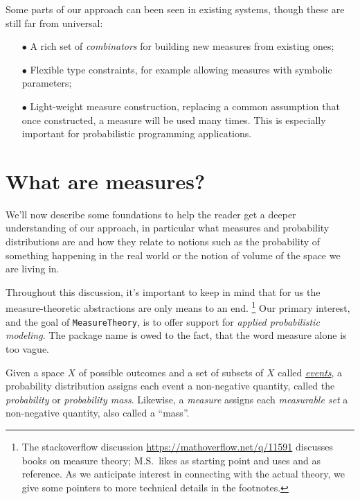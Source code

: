 \documentclass{juliacon}
\begin{document}
Some parts of our approach can been seen in existing systems, though these are still far from universal:
\begin{itemize}
    \item[$\bullet\!$] A rich set of \emph{combinators} for building new measures from existing ones;
    \item[$\bullet\!$] Flexible type constraints, for example allowing measures with symbolic parameters;
    \item[$\bullet\!$] Light-weight measure construction, replacing a common assumption that once constructed, a measure will be used many times. This is especially important for probabilistic programming applications.
\end{itemize}

\section{What are measures?}

We'll now describe some foundations to help the reader get a deeper understanding of our approach, in particular what measures and probability distributions are and how they relate to notions such as the probability of something happening in the real world or the notion of volume of the space we are living in. 

Throughout this discussion, it's important to keep in mind that for us the measure-theoretic abstractions are only means to an end.%
\footnote{The stackoverflow discussion \url{https://mathoverflow.net/q/11591} discusses books on measure theory; M.S.~likes \cite{Shiryaev1996} as starting point and uses \cite{Elstrodt2011} and \cite{Bauer_Heinz1982-01-01} as reference. As we anticipate interest in connecting with the actual theory, we give some pointers to more technical details in the footnotes.}
Our primary interest, and the goal of \verb|MeasureTheory|, is to offer support for \emph{applied probabilistic modeling}. 
The package name is owed to the fact, that the word measure alone is too vague.

Given a space $X$ of possible outcomes and a set of subsets of $X$ called \href{https://en.wikipedia.org/wiki/Event_(probability_theory)}{\emph{events}}, a probability distribution assigns each event a non-negative quantity, called the \emph{probability} or \emph{probability mass}.
Likewise, a \emph{measure} assigns each \emph{measurable set} a non-negative quantity, also called a ``mass''.
\end{document}
